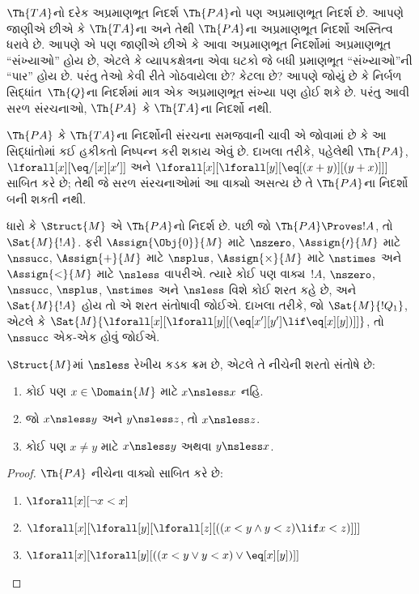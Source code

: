 \begin{explain}
$\Th{TA}$નો દરેક અપ્રમાણભૂત નિદર્શ $\Th{PA}$નો પણ અપ્રમાણભૂત નિદર્શ
છે. આપણે જાણીએ છીએ કે $\Th{TA}$ના અને તેથી $\Th{PA}$ના અપ્રમાણભૂત
નિદર્શો અસ્તિત્વ ધરાવે છે. આપણે એ પણ જાણીએ છીએ કે આવા અપ્રમાણભૂત
નિદર્શોમાં અપ્રમાણભૂત ``સંખ્યાઓ'' હોય છે, એટલે કે વ્યાપકક્ષેત્રના એવા
ઘટકો જે બધી પ્રમાણભૂત ``સંખ્યાઓ''ની ``પાર'' હોય છે. પરંતુ
તેઓ કેવી રીતે ગોઠવાયેલા છે? કેટલા છે? આપણે જોયું છે કે નિર્બળ
સિદ્ધાંત~$\Th{Q}$ના નિદર્શમાં માત્ર એક અપ્રમાણભૂત સંખ્યા પણ હોઈ શકે
છે. પરંતુ આવી સરળ સંરચનાઓ, $\Th{PA}$ કે $\Th{TA}$ના નિદર્શો
નથી.

$\Th{PA}$ કે $\Th{TA}$ના નિદર્શોની સંરચના સમજવાની ચાવી એ જોવામાં છે
કે આ સિદ્ધાંતોમાં કઈ હકીકતો નિષ્પન્ન કરી શકાય એવું છે. દાખલા તરીકે, પહેલેથી
$\Th{PA}$, $\lforall[x][\eq/[x][x']]$ અને
$\lforall[x][\lforall[y][\eq[(x+y)][(y+x)]]]$ સાબિત કરે છે; તેથી જે
સરળ સંરચનાઓમાં આ વાક્યો અસત્ય છે તે $\Th{PA}$ના નિદર્શો બની
શકતી નથી.

ધારો કે $\Struct{M}$ એ $\Th{PA}$નો નિદર્શ છે. પછી જો
$\Th{PA}\Proves !A$, તો $\Sat{M}{!A}$. ફરી
$\Assign{\Obj{0}}{M}$ માટે $\nszero$, $\Assign{\prime}{M}$ માટે
$\nssucc$, $\Assign{+}{M}$ માટે $\nsplus$,
$\Assign{\times}{M}$ માટે $\nstimes$ અને $\Assign{<}{M}$ માટે
$\nsless$ વાપરીએ. ત્યારે કોઈ પણ વાક્ય~$!A$, $\nszero$,
$\nssucc$, $\nsplus$, $\nstimes$ અને $\nsless$ વિશે કોઈ શરત કહે છે,
અને $\Sat{M}{!A}$ હોય તો એ શરત સંતોષાવી જોઈએ. દાખલા તરીકે, જો
$\Sat{M}{!Q_1}$, એટલે કે
$\Sat{M}{\lforall[x][\lforall[y][(\eq[x'][y']\lif\eq[x][y])]]}$,
તો $\nssucc$ એક-એક હોવું જોઈએ.
\end{explain}

\begin{prop}
$\Struct{M}$માં $\nsless$ રેખીય કડક ક્રમ છે, એટલે તે નીચેની શરતો
સંતોષે છે:
\begin{enumerate}
\item કોઈ પણ $x\in\Domain{M}$ માટે $x\nsless x$ નહિ.
\item જો $x\nsless y$ અને $y\nsless z$, તો $x\nsless z$.
\item કોઈ પણ $x\neq y$ માટે $x\nsless y$ અથવા $y\nsless x$.
\end{enumerate}
\end{prop}

\begin{proof}
$\Th{PA}$ નીચેના વાક્યો સાબિત કરે છે:
\begin{enumerate}
\item $\lforall[x][\lnot x < x]$
\item $\lforall[x][\lforall[y][\lforall[z][((x < y \land y < z) \lif x < z)]]]$
\item $\lforall[x][\lforall[y][((x < y \lor y < x) \lor \eq[x][y])]]$
\end{enumerate}
\end{proof}


